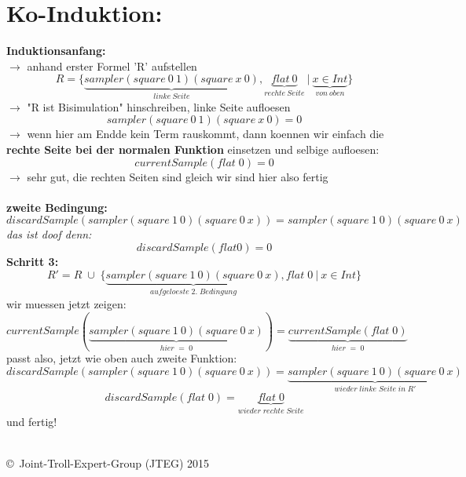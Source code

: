 \documentclass{article}
\begin{document}
	\section{Ko-Induktion:}
	\textbf{Induktionsanfang:}\\
	$\rightarrow$ anhand erster Formel 'R' aufstellen
	\[ 
		R = \{ 
			\underbrace{
				sampler(square\:0\:1)(square\:x\:0)}_{linke\:Seite},\underbrace{flat\:0}_{rechte\:Seite} \:|\: \underbrace{x\in Int}_{von\:oben}\}
		\]
	$\rightarrow$ "R ist Bisimulation" hinschreiben, linke Seite aufloesen\\
	\[ sampler(square\:0\:1)(square\:x\:0) = 0 \]
	$\rightarrow$ wenn hier am Endde kein Term rauskommt, dann koennen wir einfach die \textbf{rechte Seite bei der normalen Funktion} einsetzen und selbige aufloesen:
	\[ currentSample(flat\;0) = 0 \]
	$\rightarrow$ sehr gut, die rechten Seiten sind gleich wir sind hier also fertig\\ \\
	\textbf{zweite Bedingung:}
		\[discardSample(sampler(square\:1\:0)(square\:0\:x)) = sampler(square\:1\:0)(square\:0\:x)\]
	\textit{das ist doof denn:}
		\[discardSample(flat 0) = 0\]
	\textbf{Schritt 3:}\\
	\[R' = R \;\cup\;\{\underbrace{sampler(square\:1\:0)(square\:0\:x)}_{aufgeloeste\;2.\;Bedingung},flat\;0\:|\:x\in Int\}\]	
	wir muessen jetzt zeigen:
	\[
		currentSample(\underbrace{sampler(square\:1\:0)(square\:0\:x)}_{hier\;=\;0}) = \underbrace{currentSample(flat\;0)}_{hier\;=\;0}
	\]
	passt also, jetzt wie oben auch zweite Funktion:
	\[
		discardSample(sampler(square\:1\:0)(square\:0\:x)) = \underbrace{sampler(square\:1\:0)(square\:0\:x)}_{wieder\;linke\;Seite\;in\;R'}\]\[
		discardSample(flat\;0) = \underbrace{flat\;0}_{wieder\;rechte\;Seite}
	\]
	und fertig!\\\\
	\begin{tiny}
	\copyright\ Joint-Troll-Expert-Group (JTEG) 2015
	\end{tiny}
	\newpage
	
	
	
	
	
	
	
	
	
	
	
	
	
	
	
	
\end{document}
